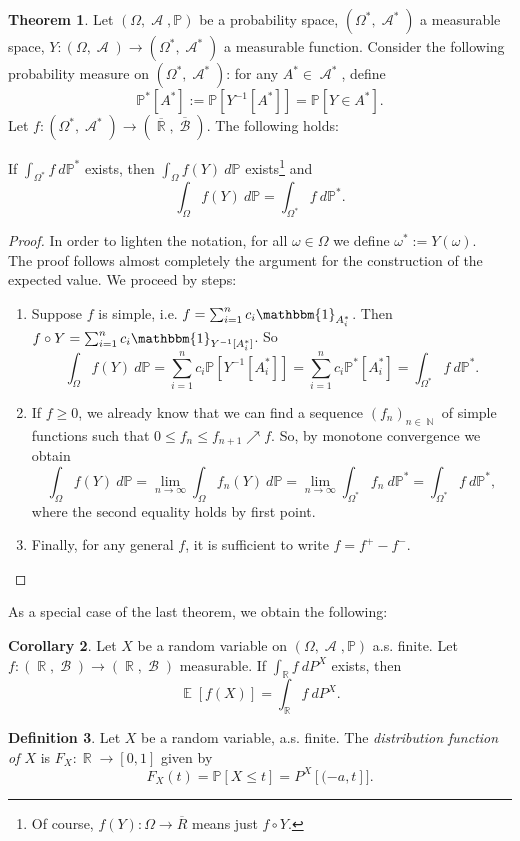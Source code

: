 \documentclass[12pt,a4paper]{report}
\theoremstyle{definition}
\newtheorem{theorem}{Theorem}[chapter] %
\newtheorem{corollary}[theorem]{Corollary} %
\newtheorem{definition}[theorem]{Definition}
\theoremstyle{num.custom-title}
\DeclareMathOperator{\A}{\mathcal{A}}
\DeclareMathOperator{\B}{\mathcal{B}}
\DeclareMathOperator{\E}{\mathbb{E}}
\DeclareMathOperator{\N}{\mathbb{N}}
\DeclareMathOperator{\R}{\mathbb{R}}
\newcommand{\ol}{\overline}
\renewcommand{\1}{\mathbbm{1}}
\renewcommand{\P}{\mathbb{P}}
\begin{document}
\begin{theorem}
Let $(\Omega,\A,\P)$ be a probability space, $(\Omega^*,\A^*)$ a measurable space, $Y: (\Omega,\A) \to (\Omega^*,\A^*)$ a measurable function. Consider the following probability measure on $(\Omega^*,\A^*)$: for any $A^* \in \A^*$, define
\[
\P^*[A^*] := \P[Y^{-1}[A^*]] = \P[Y \in A^*].
\]
Let $f: (\Omega^*, \A^*) \to (\ol{\R},\ol{\B})$. The following holds:

If $\int_{\Omega^*} f \ d\P^*$ exists, then $\int_\Omega f(Y) \ d\P$ exists\footnote{Of course, $f(Y) : \Omega \to \ol{R}$ means just $f \circ Y$.} and
\[
\int_\Omega f(Y) \ d\P = \int_{\Omega^*} f \ d\P^*.
\]
\begin{proof}
In order to lighten the notation, for all $\omega \in \Omega$ we define $\omega^* := Y(\omega)$.\\
The proof follows almost completely the argument for the construction of the expected value. We proceed by steps:
\begin{enumerate}
\item Suppose $f$ is simple, i.e. $f = \sum_{i=1}^n c_i \1_{A_i^*}$. Then $f \circ Y = \sum_{i=1}^n c_i \1_{Y^{-1}[A_i^*]}$. So
\[
\int_\Omega f(Y) \ d\P = \sum_{i=1}^n c_i \P[Y^{-1}[A_i^*]] = \sum_{i=1}^n c_i \P^*[A_i^*] = \int_{\Omega^*} f \ d\P^*.
\]
\item If $f \geq 0$, we already know that we can find a sequence $(f_n)_{n \in \N}$ of simple functions such that $0 \leq f_n \leq f_{n+1} \nearrow f$. So, by monotone convergence we obtain
\[
\int_\Omega f(Y) \ d\P = \lim_{n \to \infty} \int_\Omega f_n(Y) \ d\P = \lim_{n \to \infty} \int_{\Omega^*} f_n \ d\P^* = \int_{\Omega^*} f \ d\P^*,
\]
where the second equality holds by first point.
\item Finally, for any general $f$, it is sufficient to write $f=f^+-f^-$.
\end{enumerate}
\end{proof}
\end{theorem}

As a special case of the last theorem, we obtain the following:

\begin{corollary}
Let $X$ be a random variable on $(\Omega,\A,\P)$ a.s. finite. Let $f: (\R,\B) \to (\R,\B)$ measurable. If $\int_{\R} f \ dP^X$ exists, then 
\[
\E[f(X)] = \int_{\R} f \ dP^X.
\]
\end{corollary}

\begin{definition}
Let $X$ be a random variable, a.s. finite. The \emph{distribution function of $X$} is $F_X : \R \to [0,1]$ given by
\[
F_X(t) = \P[X \leq t] = P^X[(-a,t]].
\]
\end{definition}
\end{document}
